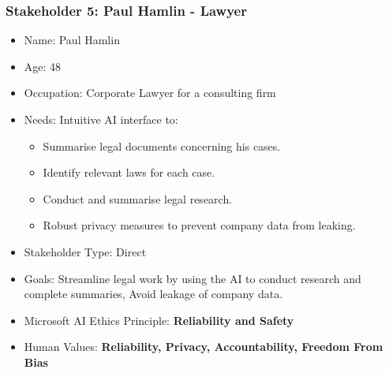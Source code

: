 \subsubsection{Stakeholder 5: Paul Hamlin - Lawyer}

\begin{itemize}
\item Name: Paul Hamlin
\item Age: 48
\item Occupation: Corporate Lawyer for a consulting firm
\item Needs: Intuitive AI interface to:
  \begin{itemize}
  \item Summarise legal documents concerning his cases.
  \item Identify relevant laws for each case.
  \item Conduct and summarise legal research.
  \item Robust privacy measures to prevent company data from leaking.
  \end{itemize}
\item Stakeholder Type: Direct
\item Goals: Streamline legal work by using the AI to conduct research and complete summaries, Avoid leakage of company data.
\item Microsoft AI Ethics Principle: \textbf{Reliability and Safety}
\item Human Values: \textbf{Reliability, Privacy, Accountability, Freedom From Bias}
\end{itemize}

